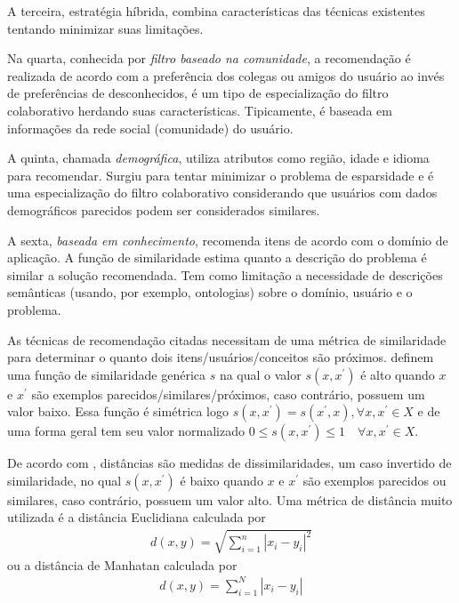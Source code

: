 A terceira, estratégia híbrida, combina características das técnicas existentes tentando minimizar suas limitações.

Na quarta, conhecida por \emph{filtro baseado na comunidade}, a recomendação é realizada de acordo com a preferência dos colegas ou amigos do usuário ao invés de preferências de desconhecidos, é um tipo de especialização do filtro colaborativo herdando suas características. Tipicamente, é baseada em informações da rede social (comunidade) do usuário.

A quinta, chamada \emph{demográfica}, utiliza atributos como região, idade e idioma para recomendar. Surgiu para tentar minimizar o problema de esparsidade e é uma especialização do filtro colaborativo considerando que usuários com dados demográficos parecidos podem ser considerados similares.

A sexta, \emph{baseada em conhecimento}, recomenda itens de acordo com o domínio de aplicação. A função de similaridade estima quanto a descrição do problema é similar a solução recomendada. Tem como limitação a necessidade de descrições semânticas (usando, por exemplo, ontologias) sobre o domínio, usuário e o problema.

As técnicas de recomendação citadas necessitam de uma métrica de similaridade para determinar o quanto dois itens/usuários/conceitos são próximos.  definem uma função de similaridade genérica \(s\) na qual o valor \(s(x,x^{'})\) é alto quando \(x\) e \(x^{'}\) são exemplos parecidos/similares/próximos, caso contrário, possuem um valor baixo. Essa função é simétrica logo \(s(x,x^{'}) = s(x^{'},x), \forall x,x^{'} \in X\) e de uma forma geral tem seu valor normalizado \(0 \leq s(x,x^{'}) \leq 1 \quad \forall x,x^{'} \in X\).

De acordo com , distâncias são medidas de dissimilaridades, um caso invertido de similaridade, no qual \(s(x,x^{'})\) é baixo quando \(x\) e \(x^{'}\) são exemplos parecidos ou similares, caso contrário, possuem um valor alto. Uma métrica de distância muito utilizada é a distância Euclidiana \cite{Deza2009} calculada por
\begin{align}
d(x,y) = \sqrt{  \sum\limits_{i=1}^{n} |x_{i} - y_{i}|^{2} } \label{dist_euclidiana}
\end{align}
ou a distância de Manhatan \cite{Deza2009} calculada por
\begin{align}
d(x, y) = \sum\limits_{i=1}^{N} |x_{i} - y_{i}|\label{dist_manhattan}
\end{align}

